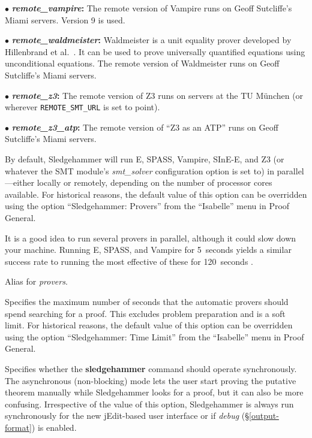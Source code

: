 \documentclass[a4paper,12pt]{article}
\begin{document}
\begin{enum}
\begin{enum}
\item[$\bullet$] \textbf{\textit{remote\_vampire}:} The remote version of
Vampire runs on Geoff Sutcliffe's Miami servers. Version 9 is used.

\item[$\bullet$] \textbf{\textit{remote\_waldmeister}:} Waldmeister is a unit
equality prover developed by Hillenbrand et al.\ \cite{waldmeister}. It can be
used to prove universally quantified equations using unconditional equations.
The remote version of Waldmeister runs on Geoff Sutcliffe's Miami servers.

\item[$\bullet$] \textbf{\textit{remote\_z3}:} The remote version of Z3 runs on
servers at the TU M\"unchen (or wherever \texttt{REMOTE\_SMT\_URL} is set to
point).

\item[$\bullet$] \textbf{\textit{remote\_z3\_atp}:} The remote version of ``Z3
as an ATP'' runs on Geoff Sutcliffe's Miami servers.
\end{enum}

By default, Sledgehammer will run E, SPASS, Vampire, SInE-E, and Z3 (or whatever
the SMT module's \textit{smt\_solver} configuration option is set to) in
parallel---either locally or remotely, depending on the number of processor
cores available. For historical reasons, the default value of this option can be
overridden using the option ``Sledgehammer: Provers'' from the ``Isabelle'' menu
in Proof General.

It is a good idea to run several provers in parallel, although it could slow
down your machine. Running E, SPASS, and Vampire for 5~seconds yields a similar
success rate to running the most effective of these for 120~seconds
\cite{boehme-nipkow-2010}.

Alias for \textit{provers}.



Specifies the maximum number of seconds that the automatic provers should spend
searching for a proof. This excludes problem preparation and is a soft limit.
For historical reasons, the default value of this option can be overridden using
the option ``Sledgehammer: Time Limit'' from the ``Isabelle'' menu in Proof
General.

Specifies whether the \textbf{sledgehammer} command should operate
synchronously. The asynchronous (non-blocking) mode lets the user start proving
the putative theorem manually while Sledgehammer looks for a proof, but it can
also be more confusing. Irrespective of the value of this option, Sledgehammer
is always run synchronously for the new jEdit-based user interface or if
\textit{debug} (\S\ref{output-format}) is enabled.


\end{enum}
\end{document}
